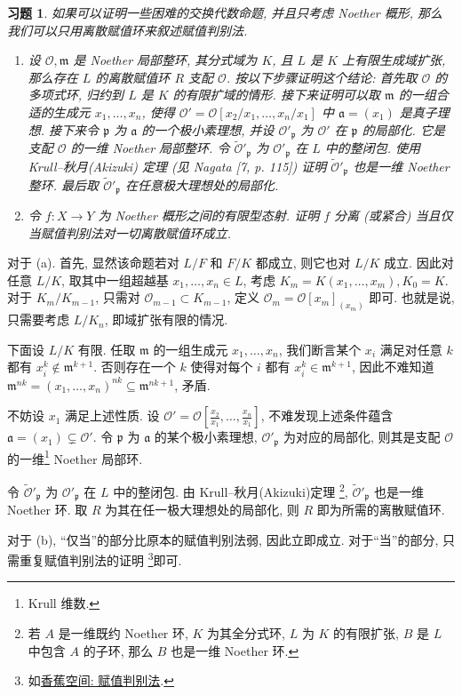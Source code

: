 \documentclass{article}
\makeatletter
\theoremstyle{exercise}
\newtheorem{exercise}{习题}[section]
\theoremstyle{plain}
\theoremstyle{remark}
\newenvironment{proofc}{\proof}{\endproof}
\def\printfootnotes{}
\def\ga{\mathfrak{a}}
\def\gp{\mathfrak{p}}
\def\gm{\mathfrak{m}}
\def\cO{\mathscr{O}}
\def\clearfootnotes{\def\@printfootnotes{}}
\makeatother
\begin{document}
\begin{exercise}
  如果可以证明一些困难的交换代数命题, 并且只考虑 Noether 概形,
  那么我们可以只用\emph{离散}赋值环来叙述赋值判别法.
  \begin{enumerate}[label=(\alph*)]
    \item 设 $\cO, \gm$ 是 Noether 局部整环, 其分式域为 $K$,
          且 $L$ 是 $K$ 上有限生成域扩张,
          那么存在 $L$ 的离散赋值环 $R$ 支配 $\cO$.
          按以下步骤证明这个结论:
          首先取 $\cO$ 的多项式环, 归约到 $L$ 是 $K$ 的有限扩域的情形.
          接下来证明可以取 $\gm$ 的一组合适的生成元 $x_1, \dots, x_n$,
          使得 $\cO' = \cO[x_2 / x_1, \dots, x_n / x_1]$ 中 $\ga = (x_1)$ 是真子理想.
          接下来令 $\gp$ 为 $\ga$ 的一个极小素理想, 并设 $\cO'_{\gp}$ 为 $\cO'$ 在 $\gp$ 的局部化.
          它是支配 $\cO$ 的一维 Noether 局部整环.
          令 $\tilde{\cO}'_{\gp}$ 为 $\cO'_{\gp}$ 在 $L$ 中的整闭包.
          使用 Krull--秋月(Akizuki) 定理 (见 Nagata [7, p. 115])
          证明 $\tilde{\cO}'_{\gp}$ 也是一维 Noether 整环.
          最后取 $\tilde{\cO}'_{\gp}$ 在任意极大理想处的局部化.
    \item 令 $f \colon X \to Y$ 为 Noether 概形之间的有限型态射.
          证明 $f$ 分离 (或紧合) 当且仅当赋值判别法对一切\emph{离散}赋值环成立.
  \end{enumerate}
\end{exercise}

\begin{proofc}
  对于 (a). 首先, 显然该命题若对 $L / F$ 和 $F / K$ 都成立, 则它也对 $L / K$ 成立.
  因此对任意 $L / K$, 取其中一组超越基 $x_1, \dots, x_n \in L$, 考虑 $K_m = K(x_1, \dots, x_m), K_0 = K$.
  对于 $K_m / K_{m - 1}$, 只需对 $\cO_{m - 1} \subset K_{m - 1}$, 定义 $\cO_m = \cO[x_m]_{(x_m)}$ 即可.
  也就是说, 只需要考虑 $L / K_n$, 即域扩张有限的情况.

  下面设 $L / K$ 有限.
  任取 $\gm$ 的一组生成元 $x_1, \dots, x_n$, 我们断言某个 $x_i$ 满足对任意 $k$ 都有 $x_i^k \notin \gm^{k+1}$.
  否则存在一个 $k$ 使得对每个 $i$ 都有 $x_i^k \in \gm^{k + 1}$,
  因此不难知道 $\gm^{nk} = (x_1, \dots, x_n)^{nk} \subseteq \gm^{nk+1}$, 矛盾.

  不妨设 $x_1$ 满足上述性质. 设 $\cO' = \cO[\frac{x_2}{x_1}, \dots, \frac{x_n}{x_1}]$,
  不难发现上述条件蕴含 $\ga = (x_1) \subsetneq \cO'$.
  令 $\gp$ 为 $\ga$ 的某个极小素理想, $\cO'_{\gp}$ 为对应的局部化, 则其是支配 $\cO$ 的一维\footnote{Krull 维数.} Noether 局部环.

  令 $\tilde{\cO}'_{\gp}$ 为 $\cO'_{\gp}$ 在 $L$ 中的整闭包. 由 Krull--秋月(Akizuki)定理
  \footnote{若 $A$ 是一维既约 Noether 环, $K$ 为其全分式环, $L$ 为 $K$ 的有限扩张, $B$ 是 $L$ 中包含 $A$ 的子环, 那么 $B$ 也是一维 Noether 环.},
  $\tilde{\cO}'_{\gp}$ 也是一维 Noether 环.
  取 $R$ 为其在任一极大理想处的局部化, 则 $R$ 即为所需的离散赋值环.

  对于 (b), ``仅当''的部分比原本的赋值判别法弱, 因此立即成立.
  对于``当''的部分, 只需重复赋值判别法的证明
  \footnote{如\href{https://www.bananaspace.org/wiki/赋值判别法}{香蕉空间: 赋值判别法}.}即可.\qedhere
  \printfootnotes
\end{proofc}
\clearfootnotes
\end{document}
